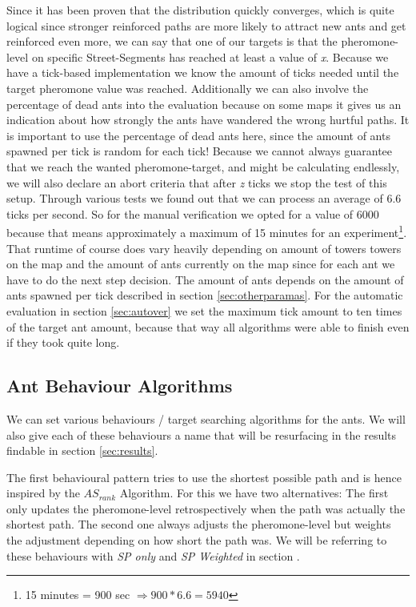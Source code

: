 Since it has been proven that the distribution quickly converges\cite[P. 15]{maniezzo2002ant}, which is quite logical since stronger reinforced paths are more likely to attract new ants and get reinforced even more, we can say that one of our targets is that the pheromone-level on specific Street-Segments has reached at least a value of \textit{x}.
Because we have a tick-based implementation we know the amount of ticks needed until the target pheromone value was reached. Additionally we can also involve the percentage of dead ants into the evaluation because on some maps it gives us an indication about how strongly the ants have wandered  the wrong hurtful paths. It is important to use the percentage of dead ants here, since the amount of ants spawned per tick is random for each tick!
Because we cannot always guarantee that we reach the wanted pheromone-target, and might be calculating endlessly, we will also declare an abort criteria that after \textit{z} ticks we stop the test of this setup. Through various tests we found out that we can process an average of 6.6 ticks per second. So for the manual verification we opted for a value of 6000 because that means approximately a maximum of 15 minutes for an experiment\footnote{15 minutes = 900 sec  $\Rightarrow 900 * 6.6 = 5940$}. That runtime of course does vary heavily depending on amount of towers towers on the map and the amount of ants currently on the map since for each ant we have to do the next step decision. The amount of ants depends on the amount of ants spawned per tick described in section \ref{sec:otherparamas}.
For the automatic evaluation in section \ref{sec:autover} we set the maximum tick amount to ten times of the target ant amount, because that way all algorithms were able to finish even if they took quite long. 


\subsection{Ant Behaviour Algorithms}
\label{sec:behaviour}
We can set various behaviours / target searching algorithms for the ants. We will also give each of these behaviours a name that will be resurfacing in the results findable in section \ref{sec:results}.

The first behavioural pattern tries to use the shortest possible path and is hence inspired by the $AS_{rank}$ Algorithm\cite{zecchin2007ant}.
For this we have two alternatives: The first only updates the pheromone-level retrospectively when the path was actually the shortest path. The second one always adjusts the pheromone-level but weights the adjustment depending on how short the path was.
We will be referring to these behaviours with \textit{SP only} and \textit{SP Weighted} in section .

